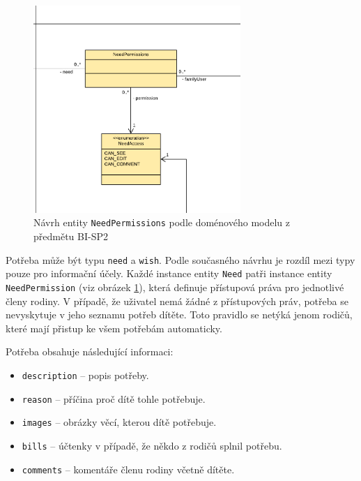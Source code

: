         \begin{figure}\centering
	        \includegraphics[width=0.7\textwidth]{pdfs/NeedPermissions1}
	        \caption[Návrh \texttt{NeedPermissions}]{Návrh entity \texttt{NeedPermissions} podle doménového modelu z předmětu BI-SP2}\label{image:NeedPermissions1}
        \end{figure}
        Potřeba může být typu \texttt{need} a \texttt{wish}. Podle současného návrhu je rozdíl mezi typy pouze pro informační účely. Každé instance entity \verb|Need| patři instance entity \verb|NeedPermission| (viz obrázek \ref{image:NeedPermissions1}), která definuje přístupová práva pro jednotlivé členy rodiny. V případě, že uživatel nemá žádné z přístupových práv, potřeba se nevyskytuje v jeho seznamu potřeb dítěte. Toto pravidlo se netýká jenom rodičů, které mají přistup ke všem potřebám automaticky.
       
       Potřeba obsahuje následující informaci:
        \begin{itemize}
            \item \texttt{description} -- popis potřeby.
            \item \texttt{reason} -- příčina proč dítě tohle potřebuje.
            \item \texttt{images} -- obrázky věcí, kterou dítě potřebuje.
            \item \texttt{bills} -- účtenky v případě, že někdo z rodičů splnil potřebu.
            \item \texttt{comments} -- komentáře členu rodiny včetně dítěte.
        \end{itemize}
    
